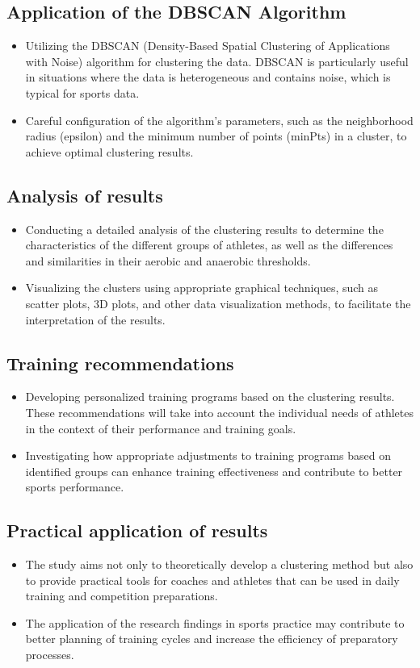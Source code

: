 \documentclass[a4paper,fleqn]{cas-dc}
\begin{document}
\subsection{Application of the DBSCAN Algorithm}
\begin{itemize}
    \item Utilizing the DBSCAN (Density-Based Spatial Clustering of Applications with Noise) algorithm for clustering the data. DBSCAN is particularly useful in situations where the data is heterogeneous and contains noise, which is typical for sports data.
    \item Careful configuration of the algorithm's parameters, such as the neighborhood radius (epsilon) and the minimum number of points (minPts) in a cluster, to achieve optimal clustering results.
\end{itemize}

\subsection{Analysis of results}
\begin{itemize}
    \item Conducting a detailed analysis of the clustering results to determine the characteristics of the different groups of athletes, as well as the differences and similarities in their aerobic and anaerobic thresholds.
    \item Visualizing the clusters using appropriate graphical techniques, such as scatter plots, 3D plots, and other data visualization methods, to facilitate the interpretation of the results.
\end{itemize}

\subsection{Training recommendations}
\begin{itemize}
    \item Developing personalized training programs based on the clustering results. These recommendations will take into account the individual needs of athletes in the context of their performance and training goals.
    \item Investigating how appropriate adjustments to training programs based on identified groups can enhance training effectiveness and contribute to better sports performance.
\end{itemize}

\subsection{Practical application of results}
\begin{itemize}
    \item The study aims not only to theoretically develop a clustering method but also to provide practical tools for coaches and athletes that can be used in daily training and competition preparations.
    \item The application of the research findings in sports practice may contribute to better planning of training cycles and increase the efficiency of preparatory processes.
\end{itemize}
\end{document}
